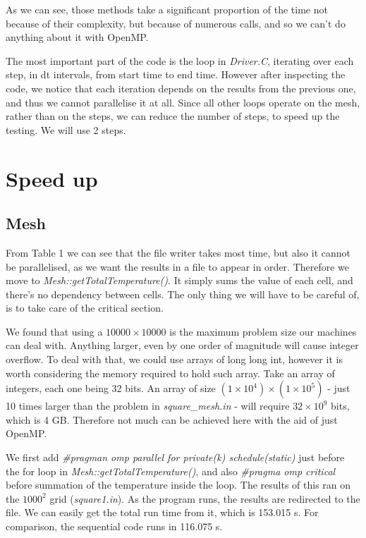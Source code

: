 \documentclass[11pt,journal]{IEEEtran}
\begin{document}
	As we can see, those methods take a significant proportion of the time not because of their complexity, but because of numerous calls, and so we can't do anything about it with OpenMP.
	
	The most important part of the code is the loop in \emph{Driver.C}, iterating over each step, in dt intervals, from start time to end time. However after inspecting the code, we notice that each iteration depends on the results from the previous one, and thus we cannot parallelise it at all. Since all other loops operate on the mesh, rather than on the steps, we can reduce the number of steps, to speed up the testing. We will use 2 steps.

	
	\section{Speed up}
	
	\subsection{Mesh}
	From Table 1 we can see that the file writer takes most time, but also it cannot be parallelised, as we want the results in a file to appear in order. Therefore we move to \emph{Mesh::getTotalTemperature()}. It simply sums the value of each cell, and there's no dependency between cells. The only thing we will have to be careful of, is to take care of the critical section.
	
	We found that using a $10000 \times 10000$ is the maximum problem size our machines can deal with. Anything larger, even by one order of magnitude will cause integer overflow. To deal with that, we could use arrays of long long int, however it is worth considering the memory required to hold such array. Take an array of integers, each one being 32 bits. An array of size $(1 \times 10^4) \times (1 \times 10^5)$ - just 10 times larger than the problem in \emph{square\_mesh.in} - will require $32 \times 10^{9}$ bits, which is 4 GB. Therefore not much can be achieved here with the aid of just OpenMP. 

	We first add \emph{\#pragman omp parallel for private(k) schedule(static)} just before the for loop in \emph{Mesh::getTotalTemperature()}, and also \emph{\#pragma omp critical} before summation of the temperature inside the loop. The results of this ran on the $1000^2$ grid (\emph{square1.in}). As the program runs, the results are redirected to the file. We can easily get the total run time from it, which is 153.015 s. For comparison, the sequential code runs in 116.075 s.
	
\end{document}
